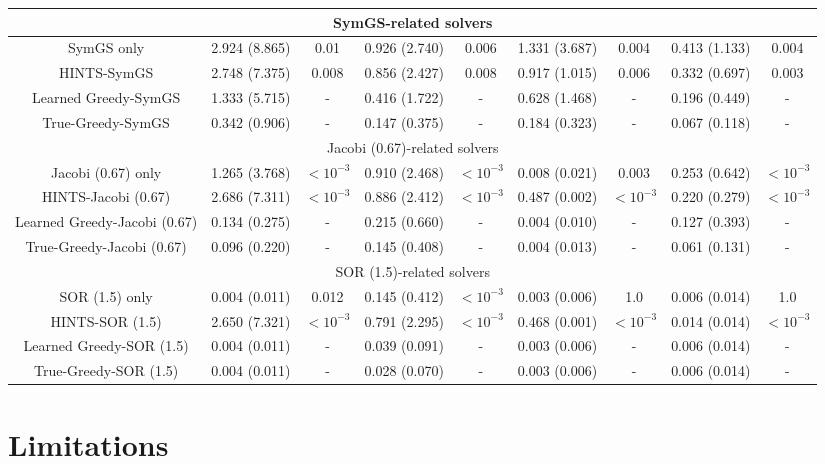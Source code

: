 \documentclass{article}
\newcommand{\edit}[1]{{\color{red}#1}}
\begin{document}
\begin{table}[H]
{\begin{tabular}{ccccccccc}
\hline
         \multicolumn{9}{c}{SymGS-related solvers}\\
         \hline
SymGS only & 2.924 (8.865) & 0.01 & 0.926 (2.740) & 0.006 & 1.331 (3.687) & 0.004 & 0.413 (1.133) & 0.004 \\
HINTS-SymGS & 2.748 (7.375) & 0.008 & 0.856 (2.427) & 0.008 & 0.917 (1.015) & 0.006 & 0.332 (0.697) & 0.003 \\
Learned Greedy-SymGS & 1.333 (5.715) & - & 0.416 (1.722) & - & 0.628 (1.468) & - & 0.196 (0.449) & - \\
True-Greedy-SymGS & 0.342 (0.906) & - & 0.147 (0.375) & - & 0.184 (0.323) & - & 0.067 (0.118) & - \\
\hline
         \multicolumn{9}{c}{Jacobi (0.67)-related solvers}\\
         \hline
Jacobi (0.67) only & 1.265 (3.768) & $<10^{-3}$ & 0.910 (2.468) & $<10^{-3}$ & 0.008 (0.021) & 0.003 & 0.253 (0.642) & $<10^{-3}$ \\
HINTS-Jacobi (0.67) & 2.686 (7.311) & $<10^{-3}$ & 0.886 (2.412) & $<10^{-3}$ & 0.487 (0.002) & $<10^{-3}$ & 0.220 (0.279) & $<10^{-3}$ \\
Learned Greedy-Jacobi (0.67) & 0.134 (0.275) & - & 0.215 (0.660) & - & 0.004 (0.010) & - & 0.127 (0.393) & - \\
True-Greedy-Jacobi (0.67) & 0.096 (0.220) & - & 0.145 (0.408) & - & 0.004 (0.013) & - & 0.061 (0.131) & - \\
\hline
         \multicolumn{9}{c}{SOR (1.5)-related solvers}\\
         \hline
SOR (1.5) only & 0.004 (0.011) & 0.012 & 0.145 (0.412) & $<10^{-3}$ & 0.003 (0.006) & 1.0 & 0.006 (0.014) & 1.0 \\
HINTS-SOR (1.5) & 2.650 (7.321) & $<10^{-3}$ & 0.791 (2.295) & $<10^{-3}$ & 0.468 (0.001) & $<10^{-3}$ & 0.014 (0.014) & $<10^{-3}$ \\
Learned Greedy-SOR (1.5) & 0.004 (0.011) & - & 0.039 (0.091) & - & 0.003 (0.006) & - & 0.006 (0.014) & - \\
True-Greedy-SOR (1.5) & 0.004 (0.011) & - & 0.028 (0.070) & - & 0.003 (0.006) & - & 0.006 (0.014) & - \\
\hline \hline 
\end{tabular}
}
    \label{tab:errorcomparison_dirichlet}
\end{table}

{\color{red}}  %

\section{Limitations}
\end{document}
